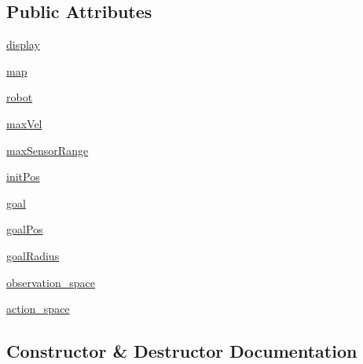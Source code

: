 \subsection*{Public Attributes}
\begin{DoxyCompactItemize}
\item 
\hyperlink{classgym__fastsim_1_1simple__nav_1_1nav__env_1_1_simple_nav_env_ae730670fbce3117c97c1141ecd583fe3}{display}
\item 
\hyperlink{classgym__fastsim_1_1simple__nav_1_1nav__env_1_1_simple_nav_env_a99698b62d5b820c419191a8d99af8eab}{map}
\item 
\hyperlink{classgym__fastsim_1_1simple__nav_1_1nav__env_1_1_simple_nav_env_a963bcfa11ccbd51373ef7762c9d5bbc7}{robot}
\item 
\hyperlink{classgym__fastsim_1_1simple__nav_1_1nav__env_1_1_simple_nav_env_a96ae8cf81f3b76208050e111e6368a0a}{max\+Vel}
\item 
\hyperlink{classgym__fastsim_1_1simple__nav_1_1nav__env_1_1_simple_nav_env_abe0c8529e28f7483f77b1ea19af1c713}{max\+Sensor\+Range}
\item 
\hyperlink{classgym__fastsim_1_1simple__nav_1_1nav__env_1_1_simple_nav_env_af4f7d3520e7f07edb78b0b6240f8e56f}{init\+Pos}
\item 
\hyperlink{classgym__fastsim_1_1simple__nav_1_1nav__env_1_1_simple_nav_env_a15f0304404f517a409201172b63bb377}{goal}
\item 
\hyperlink{classgym__fastsim_1_1simple__nav_1_1nav__env_1_1_simple_nav_env_a3c6beecc56f5af4168ca2b0a7dd3a096}{goal\+Pos}
\item 
\hyperlink{classgym__fastsim_1_1simple__nav_1_1nav__env_1_1_simple_nav_env_a60ff981fdf0abc0ea484716100aa49af}{goal\+Radius}
\item 
\hyperlink{classgym__fastsim_1_1simple__nav_1_1nav__env_1_1_simple_nav_env_a52bdd1b8acf3077ebf8ad2f397944512}{observation\+\_\+space}
\item 
\hyperlink{classgym__fastsim_1_1simple__nav_1_1nav__env_1_1_simple_nav_env_aeec039cff2f4ee406810534f2bda41f6}{action\+\_\+space}
\end{DoxyCompactItemize}


\subsection{Constructor \& Destructor Documentation}
